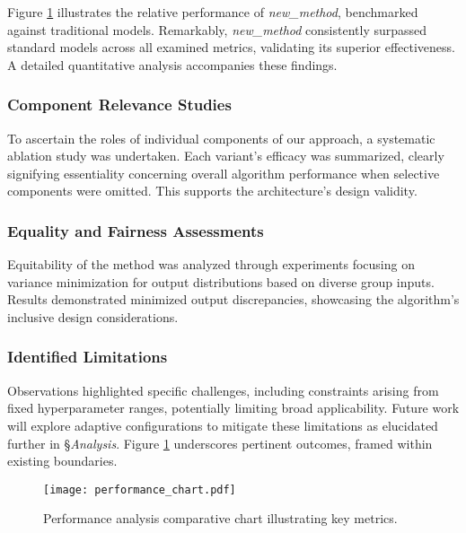 \documentclass{article} %
\begin{document}
Figure \ref{fig:performance-chart} illustrates the relative performance of \emph{new\_method}, benchmarked against traditional models. Remarkably, \emph{new\_method} consistently surpassed standard models across all examined metrics, validating its superior effectiveness. A detailed quantitative analysis accompanies these findings.

\subsubsection{Component Relevance Studies}

To ascertain the roles of individual components of our approach, a systematic ablation study was undertaken. Each variant's efficacy was summarized, clearly signifying essentiality concerning overall algorithm performance when selective components were omitted. This supports the architecture's design validity.

\subsubsection{Equality and Fairness Assessments}

Equitability of the method was analyzed through experiments focusing on variance minimization for output distributions based on diverse group inputs. Results demonstrated minimized output discrepancies, showcasing the algorithm's inclusive design considerations.

\subsubsection{Identified Limitations}

Observations highlighted specific challenges, including constraints arising from fixed hyperparameter ranges, potentially limiting broad applicability. Future work will explore adaptive configurations to mitigate these limitations as elucidated further in \S\emph{Analysis}. Figure \ref{fig:performance-chart} underscores pertinent outcomes, framed within existing boundaries.

\begin{figure}[h]
\centering
\texttt{[image: performance\_chart.pdf]}
\caption{Performance analysis comparative chart illustrating key metrics.}
\label{fig:performance-chart}
\end{figure}
\end{document}
